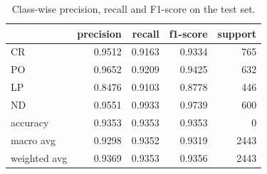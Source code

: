 \begin{table}
\caption{Class-wise precision, recall and F1-score on the test set.}
\label{tab:classification_report}
\begin{tabular}{lrrrr}
\toprule
 & precision & recall & f1-score & support \\
\midrule
CR & 0.9512 & 0.9163 & 0.9334 & 765 \\
PO & 0.9652 & 0.9209 & 0.9425 & 632 \\
LP & 0.8476 & 0.9103 & 0.8778 & 446 \\
ND & 0.9551 & 0.9933 & 0.9739 & 600 \\
accuracy & 0.9353 & 0.9353 & 0.9353 & 0 \\
macro avg & 0.9298 & 0.9352 & 0.9319 & 2443 \\
weighted avg & 0.9369 & 0.9353 & 0.9356 & 2443 \\
\bottomrule
\end{tabular}
\end{table}
